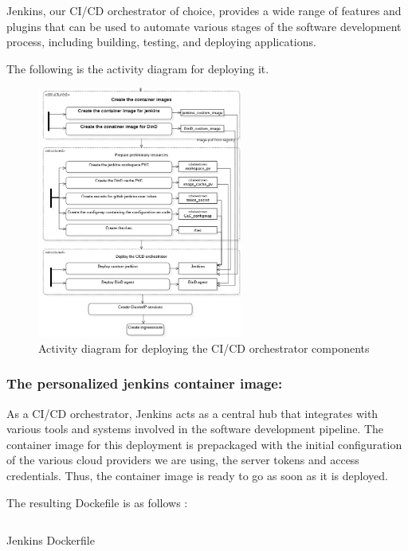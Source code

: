 Jenkins, our CI/CD orchestrator of choice, provides a wide range of features and plugins that can be used to automate various stages of the software development process, including building, testing, and deploying applications.

The following is the activity diagram for deploying it. 

\begin{figure}[H]\centering
\includegraphics[width=0.6\textwidth,angle=00]{assets/f44.png}
\caption{Activity diagram for deploying the CI/CD orchestrator components}
\label{fig:Activity diagram for deploying the CI/CD orchestrator components}
\end{figure}
 
\subsubsection{The personalized jenkins container image: }

As a CI/CD orchestrator, Jenkins acts as a central hub that integrates with various tools and systems involved in the software development pipeline. The container image for this deployment is prepackaged with the initial configuration of the various cloud providers we are using, the server tokens and access credentials. Thus, the container image is ready to go as soon as it is deployed.

\newpage

The resulting Dockefile is as follows : 

\begin{listing}[H]
    \inputminted{Dockerfile}{codeListing/jenkins_Dockerfile}
    \caption{Jenkins Dockerfile}
    \label{lst:Jenkins Dockerfile}
\end{listing}

